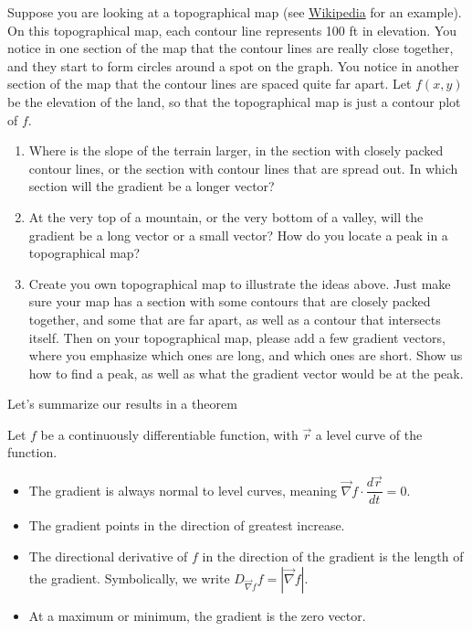 \begin{problem}
 Suppose you are looking at a topographical map (see \href{http://en.wikipedia.org/wiki/Topographic_map}{Wikipedia} for an example).  On this topographical map, each contour line represents 100 ft in elevation. You notice in one section of the map that the contour lines are really close together, and they start to form circles around a spot on the graph. You notice in another section of the map that the contour lines are spaced quite far apart. Let $f(x,y)$ be the elevation of the land, so that the topographical map is just a contour plot of $f$.  
\begin{enumerate}
 \item{}%
 Where is the slope of the terrain larger, in the section with closely packed contour lines, or the section with contour lines that are spread out. In which section will the gradient be a longer vector?
 \item At the very top of a mountain, or the very bottom of a valley, will the gradient be a long vector or a small vector? How do you locate a peak in a topographical map?
 \item {}%
Create you own topographical map to illustrate the ideas above. Just make sure your map has a section with some contours that are closely packed together, and some that are far apart, as well as a contour that intersects itself. Then on your topographical map, please add a few gradient vectors, where you emphasize which ones are long, and which ones are short. Show us how to find a peak, as well as what the gradient vector would be at the peak.  
\end{enumerate}
\end{problem}

Let's summarize our results in a theorem
\begin{theorem}
 Let $f$ be a continuously differentiable function, with $\vec r$ a level curve of the function.
\begin{itemize}
 \item The gradient is always normal to level curves, meaning $\vec \nabla f\cdot \dfrac{d\vec r}{dt}=0$.
 \item The gradient points in the direction of greatest increase.
 \item The directional derivative of $f$ in the direction of the gradient is the length of the gradient. Symbolically, we write $D_{\vec \nabla f}f = |\vec \nabla f|$.
 \item At a maximum or minimum, the gradient is the zero vector. 
\end{itemize}
\end{theorem}

